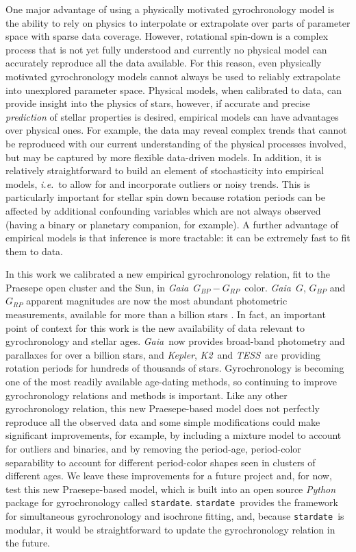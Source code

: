 \documentclass[useAMS, usenatbib, preprint, 12pt]{aastex}
\newcommand{\ie}{{\it i.e.}}
\newcommand{\kepler}{{\it Kepler}}
\newcommand{\Ktwo}{{\it K2}}
\newcommand{\ktwo}{\Ktwo}
\newcommand{\tess}{{\it TESS}}
\newcommand{\Gaia}{{\it Gaia}}
\newcommand{\gaia}{{\it Gaia}}
\newcommand{\sd}{{\tt stardate}}
\newcommand{\gcolor}{$G_{BP} - G_{RP}$}
\begin{document}
One major advantage of using a physically motivated gyrochronology model is
the ability to rely on physics to interpolate or extrapolate over parts of
parameter space with sparse data coverage.
However, rotational spin-down is a complex process that is not yet fully
understood and currently no physical model can accurately reproduce all the
data available.
For this reason, even physically motivated gyrochronology models cannot always
be used to reliably extrapolate into unexplored parameter space.
Physical models, when calibrated to data, can provide insight into the physics
of stars, however, if accurate and precise {\it prediction} of stellar
properties is desired, empirical models can have advantages over physical
ones.
For example, the data may reveal complex trends that cannot be reproduced with
our current understanding of the physical processes involved, but may be
captured by more flexible data-driven models.
In addition, it is relatively straightforward to build an element of
stochasticity into empirical models, \ie\ to allow for and incorporate
outliers or noisy trends.
This is particularly important for stellar spin down because rotation periods
can be affected by additional confounding variables which are not always
observed (having a binary or planetary companion, for example).
A further advantage of empirical models is that inference is more tractable:
it can be extremely fast to fit them to data.

In this work we calibrated a new empirical gyrochronology relation, fit to the
Praesepe open cluster and the Sun, in \gaia\ \gcolor\ color.
\Gaia\ $G$, $G_{BP}$ and $G_{RP}$ apparent magnitudes are now the most
abundant photometric measurements, available for more than a billion stars
\citep{brown2018}.
In fact, an important point of context for this work is the new
availability of data relevant to gyrochronology and stellar ages.
\Gaia\ now provides broad-band photometry and parallaxes for over a billion
stars, and \kepler, \ktwo\ and \tess\ are providing rotation periods for
hundreds of thousands of stars.
Gyrochronology is becoming one of the most readily available age-dating
methods, so continuing to improve gyrochronology relations and methods is
important.
Like any other gyrochronology relation, this new Praesepe-based model does not
perfectly reproduce all the observed data and some simple modifications could
make significant improvements, for example, by including a mixture model to
account for outliers and binaries, and by removing the period-age,
period-color separability to account for different period-color shapes seen in
clusters of different ages.
We leave these improvements for a future project and, for now, test this
new Praesepe-based model, which is built into an open source {\it Python}
package for gyrochronology called \sd.
\sd\ provides the framework for simultaneous gyrochronology and isochrone
fitting, and, because \sd\ is modular, it would be straightforward to update
the gyrochronology relation in the future.
\end{document}
